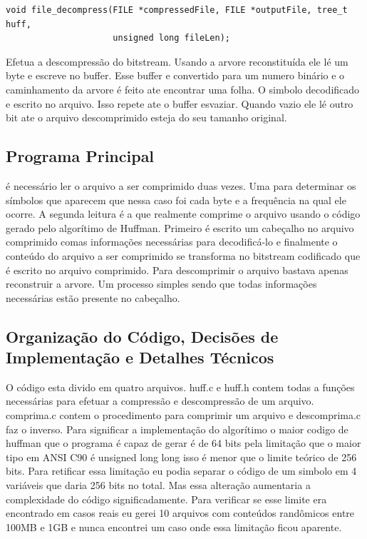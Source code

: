 \documentclass[a4paper, 11pt]{article}
\begin{document}
\begin{verbatim}
void file_decompress(FILE *compressedFile, FILE *outputFile, tree_t huff, 
                     unsigned long fileLen);
\end{verbatim} 
Efetua a descompressão do bitstream. Usando a arvore reconstituída ele lé um byte e escreve no buffer. Esse buffer e convertido para um numero binário e o caminhamento da arvore é feito ate encontrar uma folha. O simbolo decodificado e escrito no arquivo. Isso repete ate o buffer esvaziar. Quando vazio ele lé outro bit ate o arquivo descomprimido esteja do seu tamanho original.

\subsection{Programa Principal}
é necessário ler o arquivo a ser comprimido duas vezes. Uma para determinar os símbolos que aparecem que nessa caso foi cada byte e a frequência na qual ele ocorre.
A segunda leitura é a que realmente comprime o arquivo usando o código gerado pelo algorítimo de Huffman. Primeiro é escrito um cabeçalho no arquivo comprimido comas informações necessárias para decodificá-lo e finalmente o conteúdo do arquivo a ser comprimido se transforma no bitstream codificado que é escrito no arquivo comprimido. Para descomprimir o arquivo bastava apenas reconstruir a arvore. Um processo simples sendo que todas informações necessárias estão presente no cabeçalho.

\subsection{Organização do Código, Decisões de Implementação e Detalhes Técnicos}
O código esta divido em quatro arquivos. huff.c e huff.h contem todas a funções necessárias para efetuar a compressão e descompressão de um arquivo. comprima.c contem o procedimento para comprimir um arquivo e descomprima.c faz o inverso. Para significar a implementação do algorítimo o maior codigo de huffman que o programa é capaz de gerar é de 64 bits pela limitação que o maior tipo em ANSI C90 é unsigned long long isso é menor que o limite teórico de 256 bits. Para retificar essa limitação eu podia separar o código de um simbolo em 4 variáveis que daria 256 bits no total. Mas essa alteração aumentaria a complexidade do código significadamente. Para verificar se esse limite era encontrado em casos reais eu gerei 10 arquivos com conteúdos randômicos entre 100MB e 1GB e nunca encontrei um caso onde essa limitação ficou aparente.
\end{document}
